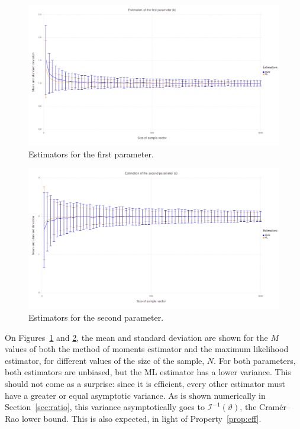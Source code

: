 \documentclass[final]{aomart}
\newtheorem[{}\it]{thm}{Theorem}[section]
\theoremstyle{definition}
\newtheorem*[{}\it]{notation}{Notation}
\numberwithin{equation}{section}
\renewcommand{\theta}{\vartheta}
\newcommand{\fisher}{\mathcal{I}} %
\begin{document}
\begin{figure}[H]
	\centering
	\includegraphics[width=\textwidth]{img/k.png}
	\caption{Estimators for the first parameter.}
	\label{fig:k_est}
\end{figure}
\begin{figure}[H]
	\centering
	\includegraphics[width=\textwidth]{img/s.png}
	\caption{Estimators for the second parameter.}
	\label{fig:s_est}
\end{figure}

On Figures~\ref{fig:k_est} and \ref{fig:s_est}, the mean and standard deviation are shown for the \(M\) values of both the method of moments estimator and the maximum likelihood estimator, for different values of the size of the sample, \(N\).
For both parameters, both estimators are unbiased, but the ML estimator has a lower variance.
This should not come as a surprise: since it is efficient, every other estimator must have a greater or equal asymptotic variance.
As is shown numerically in Section~\ref{sec:ratio},
this variance asymptotically goes to \(\fisher^{-1}(\theta)\),
the Cramér--Rao lower bound.
This is also expected, in light of Property~\ref{prop:eff}.
\end{document}
